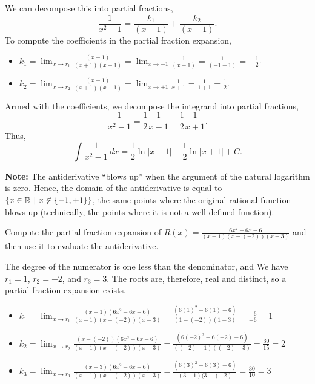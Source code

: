 We can decompose this into partial fractions,
\[ \frac{1}{x^2 - 1} = \frac{k_1}{(x-1)} + \frac{k_2}{(x+1)}. \]
To compute the coefficients in the partial fraction expansion,
\begin{itemize}
    \item $k_1 = \displaystyle \lim_{x \to r_1}\frac{(x+1)}{(x + 1)(x-1)} = \lim_{x \to -1} \frac{1}{(x -1)} =  \frac{1}{(-1 -1)} = -\frac{1}{2}$.
     \item $k_2 = \displaystyle \lim_{x \to r_2}\frac{(x-1)}{(x + 1)(x-1)} = \lim_{x \to +1}\frac{1}{x+1} = \frac{1}{1+1} = \frac{1}{2}$.
\end{itemize}

Armed with the coefficients, we decompose the integrand into partial fractions,
\[ \frac{1}{x^2 - 1} = \frac{1}{2} \frac{1}{x-1} - \frac{1}{2} \frac{1}{x+1}. \]
Thus,
\[ \int \frac{1}{x^2 - 1} \, dx = \frac{1}{2} \ln|x-1| - \frac{1}{2} \ln|x+1| + C. \]

\textbf{Note:} The antiderivative ``blows up'' when the argument of the natural logarithm is zero. Hence, the domain of the antiderivative is equal to $\{ x \in \mathbb R~|~ x \not \in \{-1, +1\} \}$, the same points where the original rational function blows up (technically, the points where it is not a well-defined function).
\Qed

\bigskip

\begin{example} Compute the partial fraction expansion of $R(x) =  \frac{6x^2 - 6x - 6}{(x - 1)(x - (-2))(x - 3)}$ and then use it to evaluate the antiderivative. 
    
\end{example}

\solution The degree of the numerator is one less than the denominator, and We have $r_1 = 1$, $r_2 = -2$, and $r_3 = 3$. The roots are, therefore, real and distinct, so a partial fraction expansion exists. 
\begin{itemize}
    \item $k_1 = \displaystyle \lim_{x \to r_1}\frac{(x-1)(6x^2 - 6x - 6)}{(x - 1)(x - (-2))(x - 3)} = \frac{(6(1)^2 - 6(1) - 6)}{(1 - (-2))(1 - 3)} = \frac{-6}{-6} = 1$
     \item $k_2 = \displaystyle \lim_{x \to r_2}\frac{(x- (-2))(6x^2 - 6x - 6)}{(x - 1)(x - (-2))(x - 3)} = \frac{(6(-2)^2 - 6(-2) - 6)}{((-2) - 1)((-2) - 3)} = \frac{30}{15} = 2$
      \item $k_3 = \displaystyle \lim_{x \to r_3}\frac{(x-3)(6x^2 - 6x - 6)}{(x - 1)(x - (-2))(x - 3)} = \frac{(6(3)^2 - 6(3) - 6)}{(3 - 1)(3 - (-2)} = \frac{30}{10} = 3$
\end{itemize}

